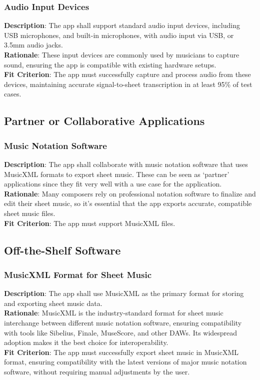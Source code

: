 \documentclass[12pt]{article}
\begin{document}
\subsubsection*{Audio Input Devices}
\textbf{Description}: The app shall support standard audio input devices, including USB microphones, and built-in microphones, with audio input via USB, or 3.5mm audio jacks.\\
\textbf{Rationale}: These input devices are commonly used by musicians to capture sound, ensuring the app is compatible with existing hardware setups.\\
\textbf{Fit Criterion}: The app must successfully capture and process audio from these devices, maintaining accurate signal-to-sheet transcription in at least 95\% of test cases.

\subsection{Partner or Collaborative Applications}
\subsubsection*{Music Notation Software}
\textbf{Description}: The app shall collaborate with music notation software that uses MusicXML formats to export sheet music. These can be seen as ‘partner’ applications since they fit very well with a use case for the application.\\
\textbf{Rationale}: Many composers rely on professional notation software to finalize and edit their sheet music, so it’s essential that the app exports accurate, compatible sheet music files.\\
\textbf{Fit Criterion}: The app must support MusicXML files.

\subsection{Off-the-Shelf Software}
\subsubsection*{MusicXML Format for Sheet Music}
\textbf{Description}: The app shall use MusicXML as the primary format for storing and exporting sheet music data.\\
\textbf{Rationale}: MusicXML is the industry-standard format for sheet music interchange between different music notation software, ensuring compatibility with tools like Sibelius, Finale, MuseScore, and other DAWs. Its widespread adoption makes it the best choice for interoperability.\\
\textbf{Fit Criterion}: The app must successfully export sheet music in MusicXML format, ensuring compatibility with the latest versions of major music notation software, without requiring manual adjustments by the user.
\end{document}
